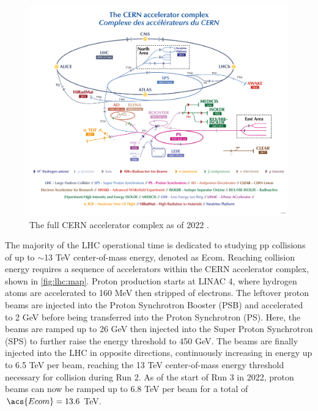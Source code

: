 \documentclass[../thesis.tex]{subfiles}
\begin{document}
\begin{figure}[!htb]
\begin{center}
\includegraphics[width=\linewidth]{fig/lhc_map.png}
\caption[The full CERN accelerator complex as of 2022.]{\label{fig:lhc:map}The full \acs{CERN} accelerator complex as of 2022 \citep{fig:lhc_map}.}
\end{center}
\end{figure}

The majority of the \acs{LHC} operational time is dedicated to studying \acs{pp} collisions of up to $\sim$13 TeV center-of-mass energy, denoted as \acs{Ecom}. Reaching collision energy requires a sequence of accelerators within the \acs{CERN} accelerator complex, shown in \autoref{fig:lhc:map}. Proton production starts at \acs{LINAC} 4, where hydrogen atoms are accelerated to 160 MeV then stripped of electrons. The leftover proton beams are injected into the Proton Synchrotron Booster (PSB) and accelerated to 2 GeV before being transferred into the Proton Synchrotron (PS). Here, the beams are ramped up to 26 GeV then injected into the Super Proton Synchrotron (SPS) to further raise the energy threshold to 450 GeV. The beams are finally injected into the \acs{LHC} in opposite directions, continuously increasing in energy up to 6.5 TeV per beam, reaching the 13 TeV center-of-mass energy threshold necessary for collision during Run 2. As of the start of Run 3 in 2022, proton beams can now be ramped up to 6.8 TeV per beam for a total of $\acs{Ecom}=13.6$ TeV.
\end{document}
